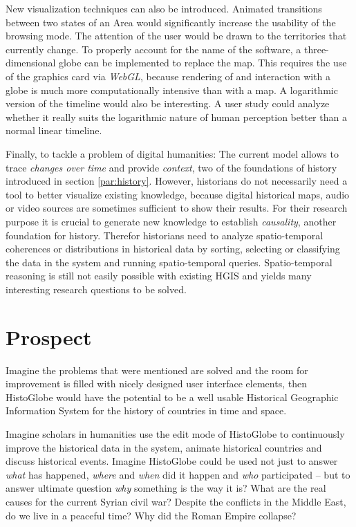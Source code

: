 New visualization techniques can also be introduced. Animated transitions between two states of an Area would significantly increase the usability of the browsing mode. The attention of the user would be drawn to the territories that currently change. To properly account for the name of the software, a three-dimensional globe can be implemented to replace the map. This requires the use of the graphics card via \emph{WebGL}, because rendering of and interaction with a globe is much more computationally intensive than with a map. A logarithmic version of the timeline would also be interesting. A user study could analyze whether it really suits the logarithmic nature of human perception better than a normal linear timeline.

Finally, to tackle a problem of digital humanities: The current model allows to trace \emph{changes over time} and provide \emph{context}, two of the foundations of history introduced in section \ref{par:history}. However, historians do not necessarily need a tool to better visualize existing knowledge, because digital historical maps, audio or video sources are sometimes sufficient to show their results. For their research purpose it is crucial to generate new knowledge to establish \emph{causality}, another foundation for history. Therefor historians need to analyze spatio-temporal coherences or distributions in historical data by sorting, selecting or classifying the data in the system and running spatio-temporal queries. Spatio-temporal reasoning is still not easily possible with existing HGIS and yields many interesting research questions to be solved.


\newpage
\section{Prospect} %
\label{sec:prospect}

Imagine the problems that were mentioned are solved and the room for improvement is filled with nicely designed user interface elements, then HistoGlobe would have the potential to be a well usable Historical Geographic Information System for the history of countries in time and space.

Imagine scholars in humanities use the edit mode of HistoGlobe to continuously improve the historical data in the system, animate historical countries and discuss historical events. Imagine HistoGlobe could be used not just to answer \emph{what} has happened, \emph{where} and \emph{when} did it happen and \emph{who} participated -- but to answer ultimate question \emph{why} something is the way it is?
What are the real causes for the current Syrian civil war?
Despite the conflicts in the Middle East, do we live in a peaceful time?
Why did the Roman Empire collapse?

